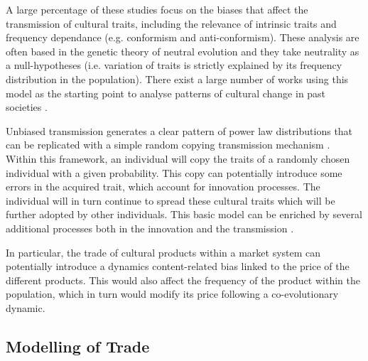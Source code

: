 \documentclass{wscpaperproc}
\begin{document}
A large percentage of these studies focus on the biases that affect the transmission of cultural traits, including the relevance of intrinsic traits and frequency dependance (e.g. conformism and anti-conformism). These analysis are often based in the genetic theory of neutral evolution \cite{neiman_stylistic_1995} and they take neutrality as a null-hypotheses (i.e. variation of traits is strictly explained by its frequency distribution in the population). There exist a large number of works using this model as the starting point to analyse patterns of cultural change in past societies \cite{lipo_neutralitystyle_2001,shennan_ceramic_2001,steele_ceramic_2010,kandler_nonequilibrium_2013,porcic_exploring_2014,crema_approximate_2014}.

Unbiased transmission generates a clear pattern of power law distributions that can be replicated with a simple random copying transmission mechanism \cite{bentley_random_2004}. Within this framework, an individual will copy the traits of a randomly chosen individual with a given probability. This copy can potentially introduce some errors in the acquired trait, which account for innovation processes. The individual will in turn continue to spread these cultural traits which will be further adopted by other individuals. This basic model can be enriched by several additional processes both in the innovation \cite{schillinger_copying_2014,sole_evolutionary_2013,ziman_technological_2003} and the transmission \cite{heyes_social_1994,henrich_evolution_2003}.

In particular, the trade of cultural products within a market system can potentially introduce a dynamics content-related bias linked to the price of the different products. This would also affect the frequency of the product within the population, which in turn would modify its price following a co-evolutionary dynamic.


\subsection{Modelling of Trade}

\end{document}
